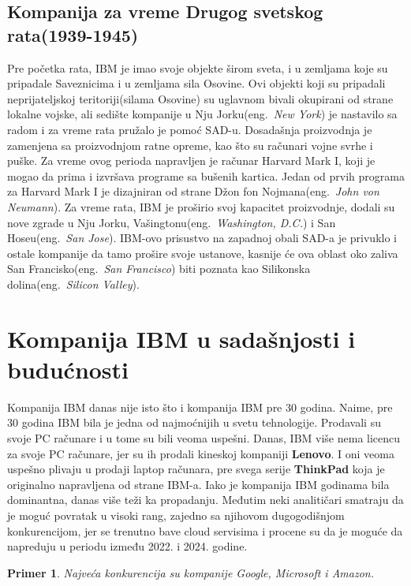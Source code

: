 \documentclass[a4paper]{article}
\newtheorem{primer}{Primer}[section]
\begin{document}
\subsection{Kompanija za vreme Drugog svetskog rata(1939-1945)}
Pre početka rata, IBM je imao svoje objekte širom sveta, i u zemljama koje su pripadale Saveznicima i u zemljama sila Osovine. Ovi objekti koji su pripadali neprijateljskoj teritoriji(silama Osovine) su uglavnom bivali okupirani od strane lokalne vojske, ali sedište kompanije u Nju Jorku(eng.~{\em New York}) je nastavilo sa radom i za vreme rata pružalo je pomoć SAD-u. Dosadašnja proizvodnja je zamenjena sa proizvodnjom ratne opreme, kao što su računari vojne svrhe i puške. Za vreme ovog perioda napravljen je računar Harvard Mark I, koji je mogao da prima i izvršava programe sa bušenih kartica. Jedan od prvih programa za Harvard Mark I je dizajniran od strane Džon fon Nojmana(eng.~{\em John von Neumann}). Za vreme rata, IBM je proširio svoj kapacitet proizvodnje, dodali su nove zgrade u Nju Jorku, Vašingtonu(eng.~{\em Washington, D.C.}) i San Hoseu(eng.~{\em San Jose}). IBM-ovo prisustvo na zapadnoj obali SAD-a je privuklo i ostale kompanije da tamo prošire svoje ustanove, kasnije će ova oblast oko zaliva San Francisko(eng.~{\em San Francisco}) biti poznata kao Silikonska dolina(eng.~{\em Silicon Valley}).

\section{Kompanija IBM u sadašnjosti i budućnosti}
Kompanija IBM danas nije isto što i kompanija IBM pre 30 godina. Naime, pre 30 godina IBM bila je jedna od najmoćnijih u svetu tehnologije. Prodavali su svoje PC računare i u tome su bili veoma uspešni.
Danas, IBM više nema licencu za svoje PC računare, jer su ih prodali kineskoj kompaniji \textbf{Lenovo}\cite{lit1}. I oni veoma uspešno plivaju u prodaji laptop računara, pre svega serije \textbf{ThinkPad} koja je originalno napravljena od strane IBM-a. Iako je kompanija IBM godinama bila dominantna, danas više teži ka propadanju. Međutim neki analitičari smatraju da je moguć povratak u visoki rang, zajedno sa njihovom dugogodišnjom konkurencijom, jer se trenutno bave cloud servisima i procene su da je moguće da napreduju u periodu između 2022. i 2024. godine.

\begin{primer}
Najveća konkurencija su kompanije Google, Microsoft i Amazon.
\end{primer}
\end{document}
